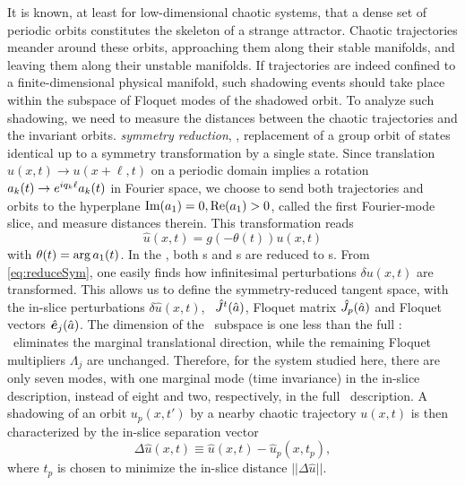 \documentclass[prl,aps,preprint,showpacs,superscriptaddress]{revtex4-1} %
\begin{document}
It is known, at least for low-dimensional chaotic systems, that a
dense set of periodic orbits constitutes the skeleton of a strange
attractor. Chaotic trajectories meander around these orbits,
approaching them along their stable manifolds, and leaving them along their unstable
manifolds. If
trajectories are indeed confined to a
finite-dimensional physical manifold, such shadowing events should take
place within the subspace of {\entangled} Floquet modes of the
shadowed orbit. To analyze such shadowing, we
need to measure the distances between the chaotic trajectories and the
invariant orbits.
 {\em symmetry reduction},
\ie, replacement of a group orbit of states identical up to a symmetry
transformation by a single state. Since translation
$u(x,t)\to{}u(x+\ell,t)$ on a periodic domain implies a rotation
$a_k(t)\to{}e^{iq_k\ell}a_k(t)$ in Fourier space,
 we choose to send both
trajectories and orbits to the hyperplane $\operatorname{Im}(a_1)=0,\operatorname{Re}(a_1)>0$, called
the first Fourier-mode slice, and measure distances
therein. This transformation reads
\begin{equation}
  \label{eq:reduceSym}
  \hat{u}(x,t) = g(-\theta(t))u(x,t)
\end{equation}
 with $\theta(t)=\arg{}a_1(t)$.
In the \slice, both \rpo s and \ppo s are reduced to \po s. From
\eqref{eq:reduceSym}, one easily finds how infinitesimal perturbations
$\delta{}u(x,t)$ are transformed.
This allows us to define the symmetry-reduced tangent space,
with the in-slice perturbations
$\delta\hat{u}(x,t)$, \JacobianM\ $\hat{J}^t(\hat{a})$,
Floquet matrix $\hat{J}_p(\hat{a})$
and Floquet vectors $\hat{\bm{e}}_j(\hat{a})$.
The dimension of the \slice\ subspace is one less than the full \statesp:
\slice\ eliminates the marginal translational direction, while the
remaining Floquet multipliers $\Lambda_j$ are unchanged.
Therefore, for the system studied here, there are only seven {\entangled}
modes, with one marginal mode (time invariance) in the in-slice
description, instead of eight and two, respectively, in the full
\statesp\ description.
A shadowing of
an orbit $u_{p}(x,t')$ by a nearby chaotic trajectory $u(x,t)$ is
then characterized by the in-slice separation vector
\begin{equation}
  \label{eq:dif}
  \Delta \hat{u}(x,t) \equiv \hat{u}(x, t) -\hat{u}_{p}(x, t_{p}),
\end{equation}
where $t_{p}$ is chosen to minimize the in-slice distance
$||\Delta\hat{u}||$.
\end{document}
